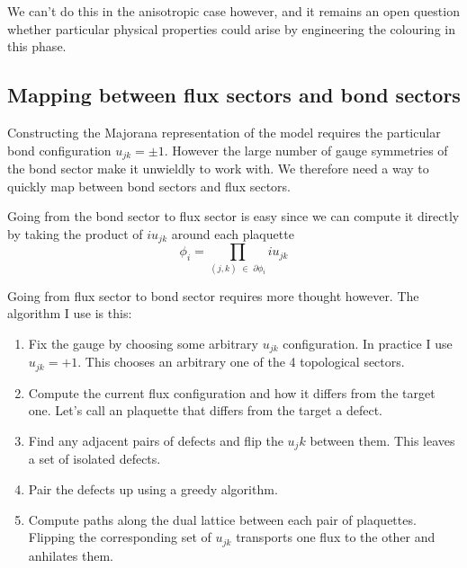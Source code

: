 We can't do this in the anisotropic case however, and it remains an open
question whether particular physical properties could arise by
engineering the colouring in this phase.

\hypertarget{mapping-between-flux-sectors-and-bond-sectors}{%
\subsection{Mapping between flux sectors and bond
sectors}\label{mapping-between-flux-sectors-and-bond-sectors}}

Constructing the Majorana representation of the model requires the
particular bond configuration \(u_{jk} = \pm 1\). However the large
number of gauge symmetries of the bond sector make it unwieldly to work
with. We therefore need a way to quickly map between bond sectors and
flux sectors.

Going from the bond sector to flux sector is easy since we can compute
it directly by taking the product of \(i u_{jk}\) around each plaquette
\[ \phi_i = \prod_{(j,k) \; \in \; \partial \phi_i} i u_{jk}\]

Going from flux sector to bond sector requires more thought however. The
algorithm I use is this:

\begin{enumerate}
\def\labelenumi{\arabic{enumi}.}
\item
  Fix the gauge by choosing some arbitrary \(u_{jk}\) configuration. In
  practice I use \(u_{jk} = +1\). This chooses an arbitrary one of the 4
  topological sectors.
\item
  Compute the current flux configuration and how it differs from the
  target one. Let's call an plaquette that differs from the target a
  defect.
\item
  Find any adjacent pairs of defects and flip the \(u_jk\) between them.
  This leaves a set of isolated defects.
\item
  Pair the defects up using a greedy algorithm.
\item
  Compute paths along the dual lattice between each pair of plaquettes.
  Flipping the corresponding set of \(u_{jk}\) transports one flux to
  the other and anhilates them.
\end{enumerate}

